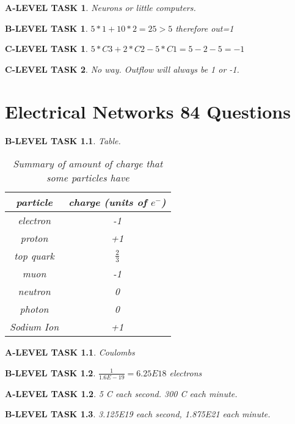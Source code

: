 \documentclass{book}
\numberwithin{equation}{section}
\newtheorem{alevel}{A-LEVEL TASK}
\newtheorem{blevel}{B-LEVEL TASK}
\newtheorem{clevel}{C-LEVEL TASK}
\theoremstyle{definition}
\begin{document}
\begin{alevel}Neurons or little computers.\end{alevel}
\begin{blevel}$5*1+10*2=25 > 5$ therefore out=1\end{blevel}
\begin{clevel}$5*C3+2*C2-5*C1=5-2-5=-1$\end{clevel}
\begin{clevel}No way. Outflow will always be 1 or -1.\end{clevel}

\setcounter{alevel}{0} \setcounter{blevel}{0} \setcounter{clevel}{0} \setcounter{dlevel}{0}
\chapter{Electrical Networks 84 Questions}
\begin{blevel}Table.\par
\begin{table}[H]
\begin{center}
\begin{tabular}{|c|c|} \hline
particle	&	charge (units of $e^-$) \\ \hline
electron	&	-1\\ \hline
proton		&	+1\\ \hline
top quark	&	$\frac{2}{3}$\\ \hline
muon		&	-1\\ \hline
neutron		&	0\\ \hline
photon		&	0\\ \hline
Sodium Ion	&	+1\\ \hline
\end{tabular}
\caption{Summary of amount of charge that some particles have}
\label{T:2EP}
\end{center}
\end{table}
\end{blevel}

\begin{alevel}Coulombs\end{alevel}
\begin{blevel}$\frac{1}{1.6E-19}=6.25E18$ electrons\end{blevel}
\begin{alevel}5 C each second. 300 C each minute.\end{alevel}
\begin{blevel}3.125E19 each second, 1.875E21 each minute.\end{blevel}
\end{document}
